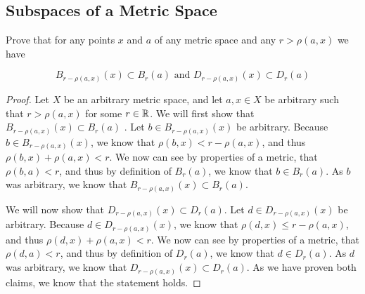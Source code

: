 \subsection{Subspaces of a Metric Space}


\begin{majorEx}%
  Prove that for any points $x$ and $a$ of any metric space and any $r
  > \rho(a,x)$ we have

  $$B_{r-\rho(a,x)}(x) \subset B_r(a) \text{  and  }
  D_{r-\rho(a,x)}(x) \subset D_r(a)$$
\end{majorEx}

\begin{proof}
  Let $X$ be an arbitrary metric space, and let $a,x\in X$ be
  arbitrary such that $r
  > \rho(a,x)$ for some $r\in \mathbb{R}$.  We will first show that 
  $B_{r-\rho(a,x)}(x) \subset B_r(a)$ . Let $b \in B_{r-\rho(a,x)}(x)$
  be arbitrary. Because $b \in B_{r-\rho(a,x)}(x)$, we know that
  $\rho(b,x) < r- \rho(a,x)$, and thus   $\rho(b,x) + \rho(a,x)<
  r$. We now can see by properties of a metric, that $\rho(b,a)<r$,
  and thus by definition of $B_r(a)$, we know that $b \in B_r(a)$. As
  $b$ was arbitrary, we know that $B_{r-\rho(a,x)}(x) \subset B_r(a)$.

  We will now show that $D_{r-\rho(a,x)}(x) \subset D_r(a)$. Let $d 
  \in D_{r-\rho(a,x)}(x)$ be arbitrary. Because $d \in D_{r-\rho(a,x)}(x)$, we know that
  $\rho(d,x) \leq r- \rho(a,x)$, and thus   $\rho(d,x) + \rho(a,x)<
  r$. We now can see by properties of a metric, that $\rho(d,a)<r$,
  and thus by definition of $D_r(a)$, we know that $d \in D_r(a)$. As
  $d$ was arbitrary, we know that $D_{r-\rho(a,x)}(x) \subset
  D_r(a)$. As we have proven both claims, we know that the statement holds.
  
\end{proof}